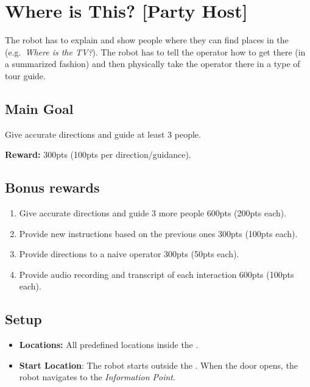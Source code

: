 \section{Where is This? [Party Host]}
\label{test:where-is-this}
The robot has to explain and show people where they can find places in the \Arena{} (e.g.~\emph{Where is the TV?}). The robot has to tell the operator how to get there (in a summarized fashion) and then physically take the operator there in a type of tour guide.


\subsection*{Main Goal}
Give accurate directions and guide at least 3 people.

\noindent\textbf{Reward:} 300pts (100pts per direction/guidance).

\subsection*{Bonus rewards}
\begin{enumerate}[nosep]
	\item Give accurate directions and guide 3 more people 600pts (200pts each).
	\item Provide new instructions based on the previous ones 300pts (100pts each).
	\item Provide directions to a naive operator 300pts (50pts each).
	\item Provide audio recording and transcript of each interaction 600pts (100pts each).
\end{enumerate}

\subsection*{Setup}
\begin{itemize}[nosep]
	\item \textbf{Locations:} All predefined locations inside the \Arena{}.

	\item \textbf{Start Location}: The robot starts outside the \Arena{}. When the door opens, the robot navigates to the \emph{Information Point}.
\end{itemize}

